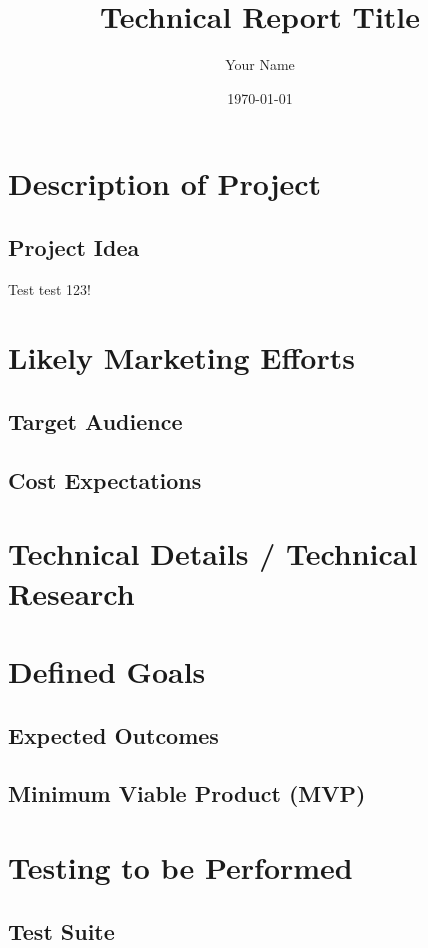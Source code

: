 \documentclass{report}
\title{Technical Report Title}
\author{Your Name}
\date{\today}
\begin{document}
\maketitle

\tableofcontents
\newpage

\chapter{Description of Project}
\section{Project Idea}
Test test 123!
\lipsum[1­—2]

\chapter{Likely Marketing Efforts}
\section{Target Audience}
\lipsum[3]
\section{Cost Expectations}
\lipsum[4]

\chapter{Technical Details / Technical Research}
\lipsum[5—6]

\chapter{Defined Goals}
\section{Expected Outcomes}
\lipsum[7]
\section{Minimum Viable Product (MVP)}
\lipsum[8]

\chapter{Testing to be Performed}
\section{Test Suite}
\lipsum[9]
\end{document}
